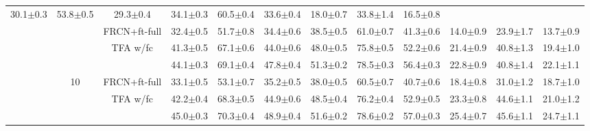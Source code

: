 \documentclass{article}
\newcommand{\model}{TFA\xspace}
\begin{document}
\begin{table*}[!h]
{\begin{tabular}{c|c|c|ccc|ccc|ccc}
    30.1$\pm$0.3&53.8$\pm$0.5&29.3$\pm$0.4&34.1$\pm$0.3&60.5$\pm$0.4&33.6$\pm$0.4&18.0$\pm$0.7&33.8$\pm$1.4&16.5$\pm$0.8 \\
    & & FRCN+ft-full & 32.4$\pm$0.5 & 51.7$\pm$0.8 & 34.4$\pm$0.6 & 38.5$\pm$0.5 & 61.0$\pm$0.7 & 41.3$\pm$0.6 & 14.0$\pm$0.9 & 23.9$\pm$1.7 & 13.7$\pm$0.9 \\
    & & {\model w/fc} & 41.3$\pm$0.5 & 67.1$\pm$0.6 & 44.0$\pm$0.6 & 48.0$\pm$0.5 & 75.8$\pm$0.5 & 52.2$\pm$0.6 & 21.4$\pm$0.9 & 40.8$\pm$1.3 & 19.4$\pm$1.0  \\
    & & \cellcolor{Gray}{\model w/cos} & \cellcolor{Gray}44.1$\pm$0.3 &\cellcolor{Gray} 69.1$\pm$0.4 & \cellcolor{Gray}47.8$\pm$0.4 & \cellcolor{Gray}51.3$\pm$0.2 & \cellcolor{Gray}78.5$\pm$0.3 & \cellcolor{Gray}56.4$\pm$0.3 & \cellcolor{Gray}22.8$\pm$0.9 & \cellcolor{Gray}40.8$\pm$1.4 & \cellcolor{Gray}22.1$\pm$1.1  \\ \cmidrule{2-12}
    & \multirow{3}{*}{10} & FRCN+ft-full & 33.1$\pm$0.5 & 53.1$\pm$0.7 & 35.2$\pm$0.5 & 38.0$\pm$0.5 & 60.5$\pm$0.7 & 40.7$\pm$0.6 & 18.4$\pm$0.8 & 31.0$\pm$1.2 & 18.7$\pm$1.0 \\
    & & {\model w/fc} & 42.2$\pm$0.4 & 68.3$\pm$0.5 & 44.9$\pm$0.6 & 48.5$\pm$0.4 & 76.2$\pm$0.4 & 52.9$\pm$0.5 & 23.3$\pm$0.8 & 44.6$\pm$1.1 & 21.0$\pm$1.2  \\
    & & \cellcolor{Gray}{\model w/cos} & \cellcolor{Gray}45.0$\pm$0.3 & \cellcolor{Gray}70.3$\pm$0.4 &\cellcolor{Gray} 48.9$\pm$0.4 &\cellcolor{Gray} 51.6$\pm$0.2 &\cellcolor{Gray} 78.6$\pm$0.2 &\cellcolor{Gray} 57.0$\pm$0.3 & \cellcolor{Gray}25.4$\pm$0.7 & \cellcolor{Gray}45.6$\pm$1.1 & \cellcolor{Gray}24.7$\pm$1.1  \\
\bottomrule
\end{tabular}}
\label{tab:voc_bench}
\end{table*}
\end{document}
